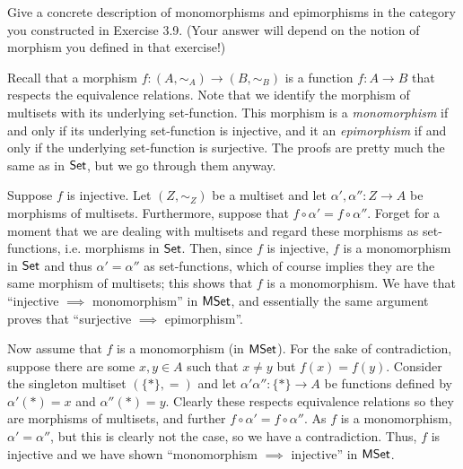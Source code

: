 \begin{exercise}
	Give a concrete description of monomorphisms and epimorphisms in the category  you constructed in Exercise 3.9. (Your answer will depend on the notion of morphism you defined in that exercise!)
\end{exercise}
\begin{solution}
	Recall that a morphism $f\colon (A,\sim_A) \to (B,\sim_B)$ is a function $f\colon A \to B$ that respects the equivalence relations. Note that we identify the morphism of multisets with its underlying set-function. This morphism is a \emph{monomorphism} if and only if its underlying set-function is injective, and it an \emph{epimorphism} if and only if the underlying set-function is surjective. The proofs are pretty much the same as in $\textsf{Set}$, but we go through them anyway. 
	
	Suppose $f$ is injective. Let $(Z,\sim_Z)$ be a multiset and let $\alpha',\alpha''\colon Z \to A$ be morphisms of multisets. Furthermore, suppose that $f\circ \alpha' = f \circ \alpha''$. Forget for a moment that we are dealing with multisets and regard these morphisms as set-functions, i.e. morphisms in $\textsf{Set}$. Then, since $f$ is injective, $f$ is a monomorphism in $\textsf{Set}$ and thus $\alpha' = \alpha''$ as set-functions, which of course implies they are the same morphism of multisets; this shows that $f$ is a monomorphism. We have that ``injective $\implies$ monomorphism'' in $\textsf{MSet}$, and essentially the same argument proves that ``surjective $\implies$ epimorphism''.
	
	Now assume that $f$ is a monomorphism (in $\textsf{MSet}$). For the sake of contradiction, suppose there are some $x,y\in A$ such that $x\neq y$ but $f(x) = f(y)$. Consider the singleton multiset $(\{*\}, =)$ and let $\alpha'\alpha'' \colon \{*\} \to A$ be functions defined by $\alpha'(*) = x$ and $\alpha''(*) = y$. Clearly these respects equivalence relations so they are morphisms of multisets, and further $f\circ \alpha' = f\circ \alpha''$. As $f$ is a monomorphism, $\alpha' = \alpha''$, but this is clearly not the case, so we have a contradiction. Thus, $f$ is injective and we have shown ``monomorphism $\implies$ injective'' in $\textsf{MSet}$.
	

\end{solution}
